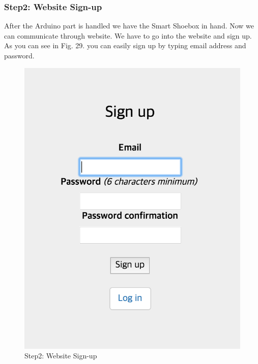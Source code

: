 \documentclass[conference]{IEEEtran}
\begin{document}
\subsubsection{Step2: Website Sign-up}
After the Arduino part is handled we have the Smart Shoebox in hand. Now we can communicate through website. We have to go into the website and sign up. As you can see in Fig. 29. you can easily sign up by typing email address and password.
\begin{figure}[H]
\begin{center}
    \includegraphics[scale=0.65]{step2}
    \caption{Step2: Website Sign-up} \label{fig:label}
\end{center}
\end{figure}
\end{document}
